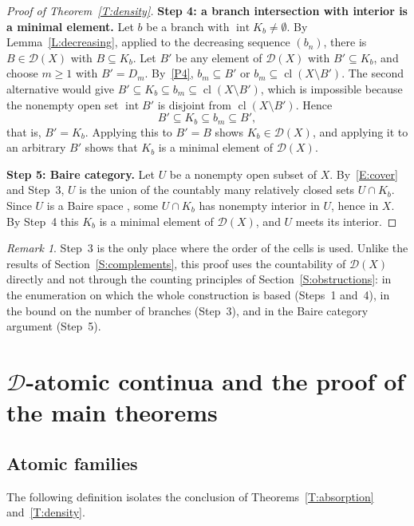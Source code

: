 \documentclass[11pt,reqno]{amsart}
\theoremstyle{plain}
\theoremstyle{definition}
\theoremstyle{remark}
\newtheorem{remark}[theorem]{Remark}
\newcommand{\D}{\mathcal{D}}
\newcommand{\cl}{\operatorname{cl}}
\newcommand{\intr}{\operatorname{int}}
\begin{document}
\begin{proof}[Proof of Theorem~\ref{T:density}]
\medskip
\noindent\textbf{Step 4: a branch intersection with interior is a minimal element.} Let $b$ be a branch with $\intr K_b\neq\emptyset$. By Lemma~\ref{L:decreasing}, applied to the decreasing sequence $(b_n)$, there is $B\in\D(X)$ with $B\subseteq K_b$. Let $B'$ be any element of $\D(X)$ with $B'\subseteq K_b$, and choose $m\ge1$ with $B'=D_m$. By~\ref{P4}, $b_m\subseteq B'$ or $b_m\subseteq\cl(X\setminus B')$. The second alternative would give $B'\subseteq K_b\subseteq b_m\subseteq\cl(X\setminus B')$, which is impossible because the nonempty open set $\intr B'$ is disjoint from $\cl(X\setminus B')$. Hence
\[
B'\subseteq K_b\subseteq b_m\subseteq B',
\]
that is, $B'=K_b$. Applying this to $B'=B$ shows $K_b\in\D(X)$, and applying it to an arbitrary $B'$ shows that $K_b$ is a minimal element of $\D(X)$.

\medskip
\noindent\textbf{Step 5: Baire category.} Let $U$ be a nonempty open subset of $X$. By~\eqref{E:cover} and Step~3, $U$ is the union of the countably many relatively closed sets $U\cap K_b$. Since $U$ is a Baire space \cite[Theorem~8.4]{Kechris}, some $U\cap K_b$ has nonempty interior in $U$, hence in $X$. By Step~4 this $K_b$ is a minimal element of $\D(X)$, and $U$ meets its interior.
\end{proof}

\begin{remark}
Step~3 is the only place where the order of the cells is used. Unlike the results of Section~\ref{S:complements}, this proof uses the countability of $\D(X)$ directly and not through the counting principles of Section~\ref{S:obstructions}: in the enumeration on which the whole construction is based (Steps~1 and~4), in the bound on the number of branches (Step~3), and in the Baire category argument (Step~5).
\end{remark}

\section{\texorpdfstring{$\D$}{D}-atomic continua and the proof of the main theorems}\label{S:atomic}

\subsection{Atomic families}
The following definition isolates the conclusion of Theorems~\ref{T:absorption} and~\ref{T:density}.
\end{document}
